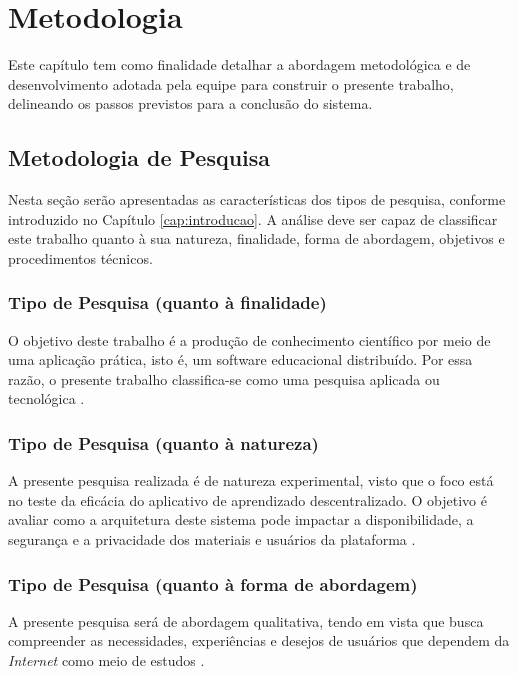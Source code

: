\chapter[Metodologia]{Metodologia}
\label{cap:metodologia}

Este capítulo tem como finalidade detalhar a abordagem metodológica e de desenvolvimento adotada pela equipe para construir o presente trabalho, delineando os passos previstos para a conclusão do sistema.

\section{Metodologia de Pesquisa}

Nesta seção serão apresentadas as características dos tipos de pesquisa, conforme introduzido no Capítulo \ref{cap:introducao}. A análise deve ser capaz de classificar este trabalho quanto à sua natureza, finalidade, forma de abordagem, objetivos e procedimentos técnicos.

\subsection{Tipo de Pesquisa (quanto à finalidade)}
O objetivo deste trabalho é a produção de conhecimento científico por meio de uma aplicação prática, isto é, um software educacional distribuído. Por essa razão, o presente trabalho classifica-se como uma pesquisa aplicada ou tecnológica \cite{fontelles2009}.

\subsection{Tipo de Pesquisa (quanto à natureza)}
A presente pesquisa realizada é de natureza experimental, visto que o foco está no teste da eficácia do aplicativo de aprendizado descentralizado. O objetivo é avaliar como a arquitetura deste sistema pode impactar a disponibilidade, a segurança e a privacidade dos materiais e usuários da plataforma \cite{fontelles2009}.

\subsection{Tipo de Pesquisa (quanto à forma de abordagem)}
A presente pesquisa será de abordagem qualitativa, tendo em vista que busca compreender as necessidades, experiências e desejos de usuários que dependem da \textit{Internet} como meio de estudos \cite{fontelles2009}.

